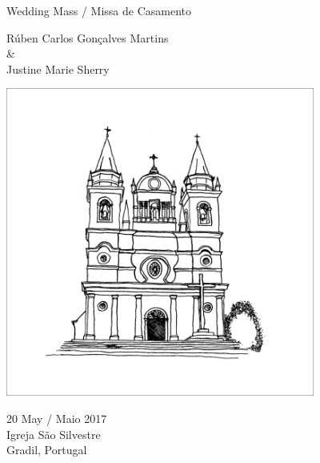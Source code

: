 \centering

\vspace*{20pt}

{\Large
  \bfseries

  Wedding Mass / Missa de Casamento
}

\vspace{20pt}


{
  \large
  Rúben Carlos Gonçalves Martins \\
  \& \\
  Justine Marie Sherry\\
}

{
  \vspace{40pt}
  \includegraphics[width=4in]{mass_pic.jpg}
  \vspace{20pt}
}

{\small
  \vspace{20pt}

  20 May / Maio 2017\\
  Igreja São Silvestre\\
  Gradil, Portugal

}


